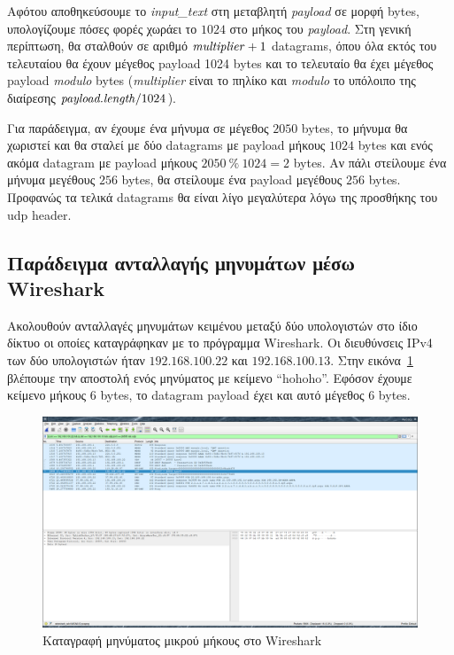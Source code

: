 \documentclass{article}
\begin{document}
Αφότου αποθηκεύσουμε το \textit{input\_text} στη μεταβλητή 
\textit{payload} σε μορφή bytes, υπολογίζουμε πόσες φορές χωράει το
$1024$ στο μήκος του \textit{payload}. Στη γενική περίπτωση, θα σταλθούν σε αριθμό
$\text{\textit{multiplier}} + 1$ datagrams, όπου όλα εκτός του τελευταίου
θα έχουν μέγεθος payload 1024 bytes και το τελευταίο θα έχει μέγεθος payload \textit{modulo}
bytes (\textit{multiplier} είναι το πηλίκο και \textit{modulo} το υπόλοιπο
της διαίρεσης $\text{\textit{payload.length}} / 1024$).

Για παράδειγμα, αν έχουμε ένα μήνυμα σε μέγεθος $2050$ bytes, το 
μήνυμα θα χωριστεί και θα σταλεί με δύο datagrams με payload μήκους $1024$ bytes
και ενός ακόμα datagram με payload μήκους $2050\ \%\ 1024 = 2$ bytes. Αν πάλι στείλουμε
ένα μήνυμα μεγέθους $256$ bytes, θα στείλουμε ένα payload μεγέθους $256$ bytes. Προφανώς
τα τελικά datagrams θα είναι λίγο μεγαλύτερα λόγω της προσθήκης του udp header.

\subsection{Παράδειγμα ανταλλαγής μηνυμάτων μέσω Wireshark}
Ακολουθούν ανταλλαγές μηνυμάτων κειμένου μεταξύ δύο υπολογιστών στο ίδιο δίκτυο 
οι οποίες καταγράφηκαν με το πρόγραμμα Wireshark. Οι διευθύνσεις IPv4 των δύο υπολογιστών
ήταν $192.168.100.22$ και $192.168.100.13$. Στην εικόνα~\ref{text-simple-n-small} βλέπουμε 
την αποστολή ενός μηνύματος με κείμενο ``hohoho''. Εφόσον έχουμε κείμενο μήκους $6$ bytes,
το datagram payload έχει και αυτό μέγεθος $6$ bytes.

\begin{figure}
    \centering
    \includegraphics[scale=0.2]{text-simple-small.png}
    \caption{Καταγραφή μηνύματος μικρού μήκους στο Wireshark}\label{text-simple-n-small}
\end{figure}
\end{document}
